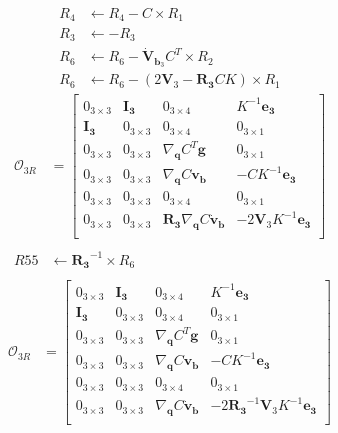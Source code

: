 \documentclass[]{article}
\begin{document}
\begin{itemize}
\begin{align*}
	R_4&\leftarrow R_4 - C\times R_1\\
	R_3&\leftarrow -R_3 \\
	R_6&\leftarrow R_6 - \bm{\dot{V}}_{\bm{b}_3}C^T \times R_2\\
	R_6&\leftarrow R_6 - (2\bm{V}_3 - \bm{R_3}CK)\times R_1
	\end{align*}
	\begin{align*}
	\mathcal{O}_{3R} &= \begin{bmatrix}
	0_{3\times 3}& \bm{I_3}& 0_{3\times 4}& K^{-1}\bm{e_3}\\
	\bm{I_3} & 0_{3\times 3} & 0_{3\times 4} & 0_{3\times 1}\\
	0_{3\times 3}& 0_{3\times 3}& \nabla_{\bm{q}} C^T\bm{g}& 0_{3\times 1}\\
	0_{3\times 3} & 0_{3\times 3} & \nabla_{\bm{q}} C\bm{v_b} & -CK^{-1}\bm{e_3}\\
	0_{3\times 3}& 	0_{3\times 3}& 	0_{3\times 4}& 	0_{3\times 1}\\
	0_{3\times 3}& 	0_{3\times 3}& \bm{R_3}\nabla_{\bm{q}} C\bm{\dot{v}_b} & -2\bm{V}_3K^{-1}\bm{e_3}\\
	\end{bmatrix}\\
	\\
	R55&\leftarrow \bm{R_3}^{-1} \times R_6\\
	\end{align*}
	\begin{align*}
	\mathcal{O}_{3R} &= \begin{bmatrix}
	0_{3\times 3}& \bm{I_3}& 0_{3\times 4}& K^{-1}\bm{e_3}\\
	\bm{I_3} & 0_{3\times 3} & 0_{3\times 4} & 0_{3\times 1}\\
	0_{3\times 3}& 0_{3\times 3}& \nabla_{\bm{q}} C^T\bm{g}& 0_{3\times 1}\\
	0_{3\times 3} & 0_{3\times 3} & \nabla_{\bm{q}} C\bm{v_b} & -CK^{-1}\bm{e_3}\\
	0_{3\times 3}& 	0_{3\times 3}& 	0_{3\times 4}& 	0_{3\times 1}\\
	0_{3\times 3}& 	0_{3\times 3}& \nabla_{\bm{q}} C\bm{\dot{v}_b} & -2\bm{R_3}^{-1}\bm{V}_3K^{-1}\bm{e_3}\\
	\end{bmatrix}\\
	\end{align*}
	

\end{itemize}
\end{document}
